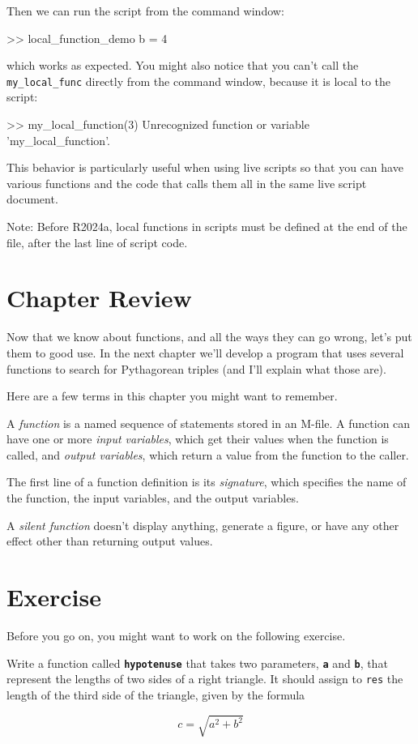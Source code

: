 Then we can run the script from the command window:
\begin{code}
    >> local_function_demo
    b =
         4
\end{code}
which works as expected.  You might also notice that you can't call the \lstinline{my_local_func} directly from the command window, because it is local to the script:
\begin{code}
    >> my_local_function(3)
    Unrecognized function or variable 'my_local_function'. 
\end{code}

This behavior is particularly useful when using live scripts so that you can have various functions and the code that calls them all in the same live script document.

Note: Before R2024a, local functions in scripts must be defined at the end of the file, after the last line of script code.

\section{Chapter Review}

Now that we know about functions, and all the ways they can go wrong, let's put them to good use.  In the next chapter we'll develop a program that uses several functions to search for Pythagorean triples (and I'll explain what those are).

Here are a few terms in this chapter you might want to remember.

A \emph{function} is a named sequence of statements stored in an M-file.
A function can have one or more \emph{input variables}, which get their values when the function is called, and \emph{output variables}, which return a value from the function to the caller.

The first line of a function definition is its \emph{signature}, which
specifies the name of the function, the input variables, and the
output variables.

A \emph{silent function} doesn't display anything, generate a figure, or have any other effect other than returning output values.


\section{Exercise}

Before you go on, you might want to work on the following exercise.

\begin{ex}
\label{hypotenuse_exercise}
Write a function called \textbf{\lstinline{hypotenuse}} that takes two parameters, \textbf{\lstinline{a}} and \textbf{\lstinline{b}}, that represent the lengths of two sides of a right triangle.  It should assign to \lstinline{res} the length of the third side of the triangle, given by the formula

\[ c = \sqrt{a^2 + b^2} \]

\end{ex}
